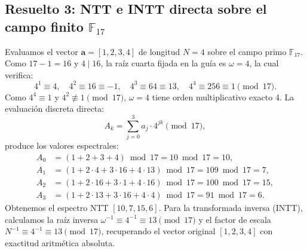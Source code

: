 \subsection{Resuelto 3: NTT e INTT directa sobre el campo finito $\mathbb{F}_{17}$}
Evaluamos el vector $\mathbf{a} = [1, 2, 3, 4]$ de longitud $N=4$ sobre el campo primo $\mathbb{F}_{17}$. Como $17 - 1 = 16$ y $4 \mid 16$, la raíz cuarta fijada en la guía es $\omega = 4$, la cual verifica:
\begin{equation}
4^1 \equiv 4, \quad 4^2 \equiv 16 \equiv -1, \quad 4^3 \equiv 64 \equiv 13, \quad 4^4 \equiv 256 \equiv 1 \pmod{17}.
\end{equation}
Como $4^4 \equiv 1$ y $4^2 \not\equiv 1 \pmod{17}$, $\omega = 4$ tiene orden multiplicativo exacto 4. La evaluación discreta directa:
\begin{equation}
A_k = \sum_{j=0}^3 a_j \cdot 4^{jk} \pmod{17},
\end{equation}
produce los valores espectrales:
\begin{align}
A_0 &= (1 + 2 + 3 + 4) \bmod 17 = 10 \bmod 17 = 10, \\
A_1 &= (1 + 2 \cdot 4 + 3 \cdot 16 + 4 \cdot 13) \bmod 17 = 109 \bmod 17 = 7, \\
A_2 &= (1 + 2 \cdot 16 + 3 \cdot 1 + 4 \cdot 16) \bmod 17 = 100 \bmod 17 = 15, \\
A_3 &= (1 + 2 \cdot 13 + 3 \cdot 16 + 4 \cdot 4) \bmod 17 = 91 \bmod 17 = 6.
\end{align}
Obtenemos el espectro NTT $[10, 7, 15, 6]$. Para la transformada inversa (INTT), calculamos la raíz inversa $\omega^{-1} \equiv 4^{-1} \equiv 13 \pmod{17}$ y el factor de escala $N^{-1} \equiv 4^{-1} \equiv 13 \pmod{17}$, recuperando el vector original $[1, 2, 3, 4]$ con exactitud aritmética absoluta.

